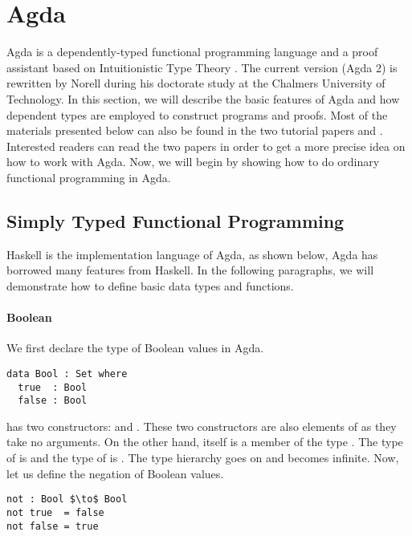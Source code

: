 \section{Agda}
\par Agda is a dependently-typed functional programming language and a
proof assistant based on Intuitionistic Type Theory
\cite{martin1984}. The current version (Agda 2) is rewritten by Norell
\cite{norell2007} during his doctorate study at the Chalmers University of
Technology. In this section, we will describe the basic features of
Agda and how dependent types are employed to construct programs and
proofs. Most of the materials presented below can also be
found in the two tutorial papers \cite{bove2009} and
\cite{norell2009}. Interested readers can read the two papers in order to get
a more precise idea on how to work with Agda. Now, we will begin by
showing how to do ordinary functional programming in Agda. 


\subsection{Simply Typed Functional Programming}
\par Haskell is the implementation language
of Agda, as shown below, Agda has borrowed many features from
Haskell. In the following paragraphs, we will demonstrate how to
define basic data types and functions. 

\paragraph{Boolean} We first declare the type of Boolean values in Agda.  
\begin{lstlisting}[mathescape=true,xleftmargin=.3\textwidth]
data Bool : Set where
  true  : Bool
  false : Bool
\end{lstlisting}

\par {} has two
constructors:  and . These two constructors
are also elements of  as they take no arguments. On
the other hand,  itself is a member of the type
. The type of  is  and the type of  is
. The type hierarchy goes on and becomes infinite. Now, let
us define the negation of Boolean values. 
\begin{lstlisting}[mathescape=true,xleftmargin=.3\textwidth]
not : Bool $\to$ Bool
not true  = false
not false = true
\end{lstlisting}


